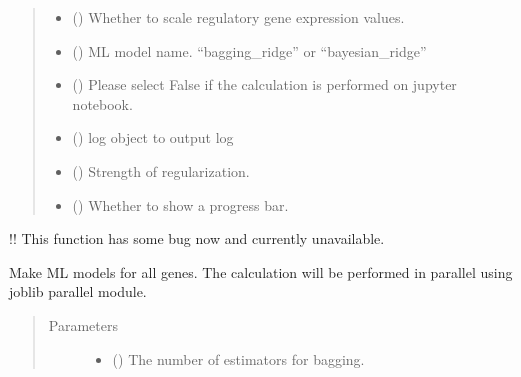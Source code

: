 \documentclass[letterpaper,10pt,english]{sphinxmanual}
\begin{document}
\begin{fulllineitems}
\begin{fulllineitems}
\begin{quote}
\begin{description}
\begin{itemize}
\item {} 
 () \textendash{} Whether to scale regulatory gene expression values.

\item {} 
 () \textendash{} ML model name. “bagging\_ridge” or “bayesian\_ridge”

\item {} 
 () \textendash{} Please select False if the calculation is performed on jupyter notebook.

\item {} 
 () \textendash{} log object to output log

\item {} 
 () \textendash{} Strength of regularization.

\item {} 
 () \textendash{} Whether to show a progress bar.

\end{itemize}

\end{description}\end{quote}

\end{fulllineitems}


\begin{fulllineitems}
\label{\detokenize{modules/celloracle:celloracle.Net.fit_All_genes_parallel}}
!! This function has some bug now and currently unavailable.

Make ML models for all genes.
The calculation will be performed in parallel using joblib parallel module.
\begin{quote}\begin{description}
\item[{Parameters}] \leavevmode\begin{itemize}
\item {} 
 () \textendash{} The number of estimators for bagging.


\end{itemize}
\end{description}
\end{quote}
\end{fulllineitems}
\end{fulllineitems}
\end{document}
